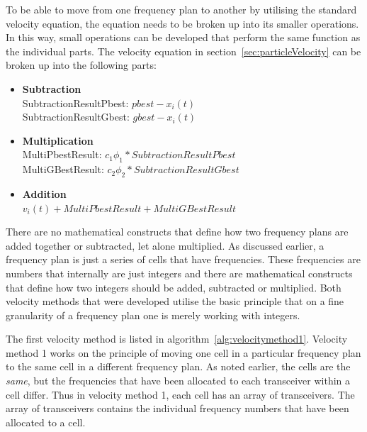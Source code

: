 To be able to move from one frequency plan to another by utilising the standard velocity equation, the equation needs to be broken up into its smaller operations. In this way, small operations can be developed that perform the same function as the individual parts. The velocity equation in section~\ref{sec:particleVelocity} can be broken up into the following parts:
\label{lst:velocitybreakup}
\begin{itemize}
\item \textbf{Subtraction} \\SubtractionResultPbest: $pbest - x_i(t)$\\SubtractionResultGbest: $gbest - x_i(t)$
\\
\item \textbf{Multiplication} \\MultiPbestResult: $c_1\phi_1 * SubtractionResultPbest$\\MultiGBestResult: $c_2\phi_2 * SubtractionResultGbest$ 
\item \textbf{Addition}\\$v_i(t) + MultiPbestResult + MultiGBestResult$
\end{itemize}
There are no mathematical constructs that define how two frequency plans are added together or subtracted, let alone multiplied. As discussed earlier, a frequency plan is just a series of cells that have frequencies. These frequencies are numbers that internally are just integers and there are mathematical constructs that define how two integers should be added, subtracted or multiplied. Both velocity methods that were developed utilise the basic principle that on a fine granularity of a frequency plan one is merely working with integers.


The first velocity method is listed in algorithm~\ref{alg:velocitymethod1}. Velocity method 1 works on the principle of moving one cell in a particular frequency plan to the same cell in a different frequency plan. As noted earlier, the cells are the \emph{same}, but the frequencies that have been allocated to each transceiver within a cell differ. Thus in velocity method 1, each cell has an array of transceivers. The array of transceivers contains the individual frequency numbers that have been allocated to a cell.

